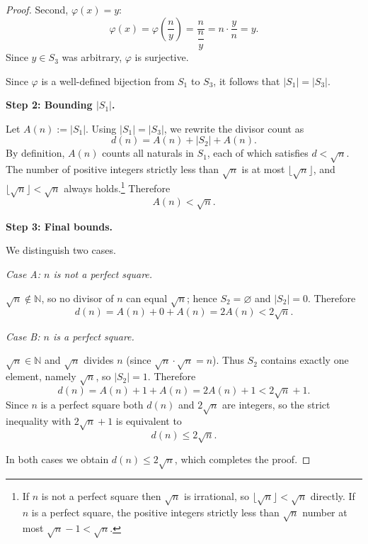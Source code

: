 \documentclass[12pt]{article}
\theoremstyle{remark}
\begin{document}
\begin{proof}
Second, $\varphi(x) = y$:
\[
    \varphi(x) = \varphi\!\left(\frac{n}{y}\right)
               = \frac{n}{\dfrac{n}{y}}
               = n \cdot \frac{y}{n}
               = y.
\]
Since $y \in S_3$ was arbitrary, $\varphi$ is surjective.

\medskip
Since $\varphi$ is a well-defined bijection from $S_1$ to $S_3$, it follows
that $|S_1| = |S_3|$.

\bigskip
\noindent\textbf{Step 2: Bounding $|S_1|$.}

Let $A(n) := |S_1|$.  Using $|S_1| = |S_3|$, we rewrite the divisor count as
\[
    d(n) = A(n) + |S_2| + A(n).
\]
By definition, $A(n)$ counts all naturals in $S_1$, each of which satisfies
$d < \sqrt{n}$.  The number of positive integers strictly less than $\sqrt{n}$
is at most $\lfloor\sqrt{n}\rfloor$, and $\lfloor\sqrt{n}\rfloor < \sqrt{n}$
always holds.\footnote{%
  If $n$ is not a perfect square then $\sqrt{n}$ is irrational, so
  $\lfloor\sqrt{n}\rfloor < \sqrt{n}$ directly.
  If $n$ is a perfect square, the positive integers strictly less than
  $\sqrt{n}$ number at most $\sqrt{n}-1 < \sqrt{n}$.}
Therefore
\[
    A(n) < \sqrt{n}.
\]

\bigskip
\noindent\textbf{Step 3: Final bounds.}

We distinguish two cases.

\medskip
\noindent\textit{Case A: $n$ is not a perfect square.}

$\sqrt{n} \notin \mathbb{N}$, so no divisor of $n$ can equal $\sqrt{n}$; hence
$S_2 = \varnothing$ and $|S_2| = 0$.  Therefore
\[
    d(n) = A(n) + 0 + A(n) = 2A(n) < 2\sqrt{n}.
\]

\medskip
\noindent\textit{Case B: $n$ is a perfect square.}

$\sqrt{n} \in \mathbb{N}$ and $\sqrt{n}$ divides $n$ (since
$\sqrt{n} \cdot \sqrt{n} = n$).  Thus $S_2$ contains exactly one element,
namely $\sqrt{n}$, so $|S_2| = 1$.  Therefore
\[
    d(n) = A(n) + 1 + A(n) = 2A(n) + 1 < 2\sqrt{n} + 1.
\]
Since $n$ is a perfect square both $d(n)$ and $2\sqrt{n}$ are integers, so
the strict inequality with $2\sqrt{n}+1$ is equivalent to
\[
    d(n) \leq 2\sqrt{n}.
\]

\medskip
\noindent In both cases we obtain $d(n) \leq 2\sqrt{n}$, which completes the
proof.
\end{proof}
\end{document}
